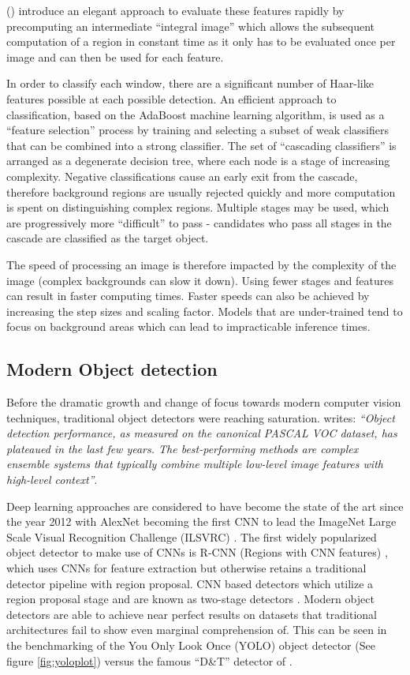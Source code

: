 \documentclass[a4paper,twoside,12pt]{report}
\begin{document}
\citeauthor{vjdet} (\citeyear{vjdet}) introduce an elegant approach to evaluate these features rapidly by precomputing an intermediate ``integral image'' which allows the subsequent computation of a region in constant time as it only has to be evaluated once per image and can then be used for each feature.

In order to classify each window, there are a significant number of Haar-like features possible at each possible detection. An efficient approach to classification, based on the AdaBoost machine learning algorithm, is used as a ``feature selection'' process by training and selecting a subset of weak classifiers that can be combined into a strong classifier. The set of ``cascading classifiers'' is arranged as a degenerate decision tree, where each node is a stage of increasing complexity. Negative classifications cause an early exit from the cascade, therefore background regions are usually rejected quickly and more computation is spent on distinguishing complex regions.  Multiple stages may be used, which are progressively more ``difficult'' to pass - candidates who pass all stages in the cascade are classified as the target object.

The speed of processing an image is therefore impacted by the complexity of the image (complex backgrounds can slow it down). Using fewer stages and features can result in faster computing times. Faster speeds can also be achieved by increasing the step sizes and scaling factor. Models that are under-trained tend to focus on background areas which can lead to impracticable inference times. 

\newpage
\subsection{Modern Object detection}

Before the dramatic growth and change of focus towards modern computer vision techniques, traditional object detectors were reaching saturation. \cite{rcnn} writes: \textit{``Object detection performance, as measured on the canonical PASCAL VOC dataset, has plateaued in the last few years. The best-performing methods are complex ensemble systems that typically combine multiple low-level image features with high-level context''}.

Deep learning approaches are considered to have become the state of the art since the year 2012 with AlexNet becoming the first CNN to lead the ImageNet Large Scale Visual Recognition Challenge (ILSVRC) \citep{alexnet}. The first widely popularized object detector to make use of CNNs is R-CNN (Regions with CNN features) \citep{rcnn}, which uses CNNs for feature extraction but otherwise retains a traditional detector pipeline with region proposal. CNN based detectors which utilize a region proposal stage and are known as two-stage detectors \citep{comprehensive}.  Modern object detectors are able to achieve near perfect results on datasets that traditional architectures fail to show even marginal comprehension of. This can be seen in the benchmarking of the You Only Look Once (YOLO) object detector (See figure \ref{fig:yoloplot}) \citep{yolo} versus the famous ``D\&T'' detector of \cite{hog}.
\end{document}

